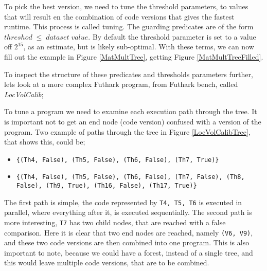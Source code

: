 To pick the best version, we need to tune the threshold parameters, to values that will result en the combination of code versions that gives the fastest runtime. This process is called tuning. The guarding predicates are of the form $threshod \; \leq \; dataset\; value$. By default the threshold parameter is set to a value off $2^{15}$, as an estimate, but is likely sub-optimal. With these terms, we can now fill out the example in Figure \ref{MatMultTree}, getting Figure \ref{MatMultTreeFilled}. 
\begin{center}
	\centering 
	
	\label{MatMultTreeFilled}
\end{center}
To inspect the structure of these predicates and thresholds parameters further, lets look at a more complex Futhark program, from Futhark bench, called \textit{LocVolCalib};
\begin{center}
	\centering
	
	\label{LocVolCalibTree}
\end{center}
\noindent To tune a program we need to examine each execution path through the tree. It is important not to get an end node (code version) confused with a version of the program. Two example of paths through the tree in Figure \ref{LocVolCalibTree}, that shows this, could be;
\begin{itemize}
	\item \texttt{\{(Th4, False), (Th5, False), (Th6, False), (Th7, True)\}}
	\item \texttt{\{(Th4, False), (Th5, False), (Th6, False), (Th7, False), (Th8, False), (Th9, True), (Th16, False), (Th17, True)\}}
\end{itemize}  
The first path is simple, the code represented by \texttt{T4, T5, T6} is executed in parallel, where everything after it, is executed sequentially. The second path is more interesting, \texttt{T7} has two child nodes, that are reached with a false comparison. Here it is clear that two end nodes are reached, namely \texttt{(V6, V9)}, and these two code versions are then combined into one program. This is also important to note, because we could have a forest, instead of a single tree, and this would leave multiple code versions, that are to be combined.

